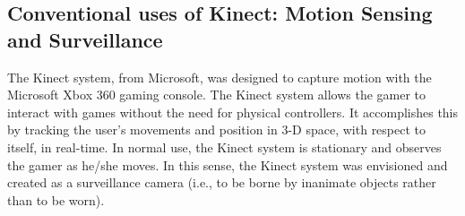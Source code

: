 
\subsection{Conventional uses of Kinect: Motion Sensing and Surveillance}
The Kinect system, from Microsoft, was designed to capture motion with the Microsoft Xbox 360 
gaming console.  The Kinect system allows the gamer to interact with games without the need for 
physical controllers. It accomplishes this by tracking the user's movements and position in 3-D 
space, with respect to itself, in real-time. In normal use, the Kinect system is stationary and 
observes the gamer as he/she moves.  In this sense, the Kinect system was envisioned and 
created as a surveillance camera (i.e., to be borne by inanimate objects rather than to be worn). 


